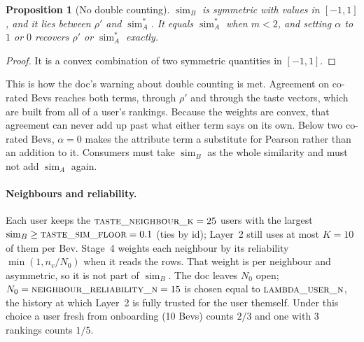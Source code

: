 \documentclass[11pt]{article}
\DeclareMathOperator{\simi}{sim}
\theoremstyle{plain}
\newtheorem{proposition}[theorem]{Proposition}
\theoremstyle{definition}
\theoremstyle{remark}
\begin{document}
\begin{proposition}[No double counting]\label{prop:blend-sim}
$\simi_B$ is symmetric with values in $[-1, 1]$, and it lies between $\rho'$ and $\simi^\ast_A$. It equals $\simi^\ast_A$ when $m < 2$, and setting $\alpha$ to $1$ or $0$ recovers $\rho'$ or $\simi^\ast_A$ exactly.
\end{proposition}
\begin{proof}
It is a convex combination of two symmetric quantities in $[-1, 1]$.
\end{proof}

This is how the doc's warning about double counting is met. Agreement on co-rated Bevs reaches both terms, through $\rho'$ and through the taste vectors, which are built from all of a user's rankings. Because the weights are convex, that agreement can never add up past what either term says on its own. Below two co-rated Bevs, $\alpha = 0$ makes the attribute term a substitute for Pearson rather than an addition to it. Consumers must take $\simi_B$ as the whole similarity and must not add $\simi_A$ again.

\paragraph{Neighbours and reliability.} Each user keeps the $\textsc{taste\_neighbour\_k} = 25$ users with the largest $\simi_B \ge \textsc{taste\_sim\_floor} = 0.1$ (ties by id); Layer~2 still uses at most $K = 10$ of them per Bev. Stage~4 weights each neighbour by its reliability $\min(1, n_v / N_0)$ when it reads the rows. That weight is per neighbour and asymmetric, so it is not part of $\simi_B$. The doc leaves $N_0$ open; $N_0 = \textsc{neighbour\_reliability\_n} = 15$ is chosen equal to $\textsc{lambda\_user\_n}$, the history at which Layer~2 is fully trusted for the user themself. Under this choice a user fresh from onboarding (10 Bevs) counts $2/3$ and one with 3 rankings counts $1/5$.
\end{document}
